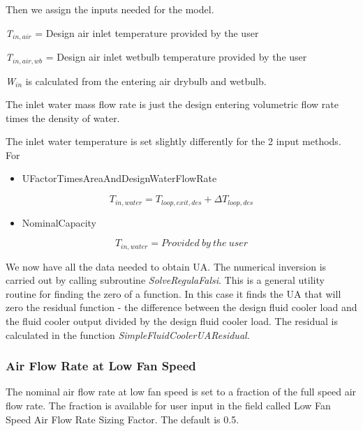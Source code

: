 Then we assign the inputs needed for the model.

\emph{T\(_{in,air}\)} = Design air inlet temperature provided by the user

\emph{T\(_{in,air,wb}\)} = Design air inlet wetbulb temperature provided by the user

\emph{W\(_{in}\)} is calculated from the entering air drybulb and wetbulb.

The inlet water mass flow rate is just the design entering volumetric flow rate times the density of water.

The inlet water temperature is set slightly differently for the 2 input methods. For

\begin{itemize}
\tightlist
\item
  UFactorTimesAreaAndDesignWaterFlowRate
\end{itemize}

\begin{equation}
{T_{in,water}} = {T_{loop,exit,des}} + \Delta {T_{loop,des}}
\end{equation}

\begin{itemize}
\tightlist
\item
  NominalCapacity
\end{itemize}

\begin{equation}
{T_{in,water}} = Provided~by~the~user
\end{equation}

We now have all the data needed to obtain UA. The numerical inversion is carried out by calling subroutine \emph{SolveRegulaFalsi}. This is a general utility routine for finding the zero of a function. In this case it finds the UA that will zero the residual function - the difference between the design fluid cooler load and the fluid cooler output divided by the design fluid cooler load. The residual is calculated in the function \emph{SimpleFluidCoolerUAResidual.}

\subsubsection{Air Flow Rate at Low Fan Speed}\label{air-flow-rate-at-low-fan-speed-1}

The nominal air flow rate at low fan speed is set to a fraction of the full speed air flow rate. The fraction is available for user input in the field called Low Fan Speed Air Flow Rate Sizing Factor. The default is 0.5.

